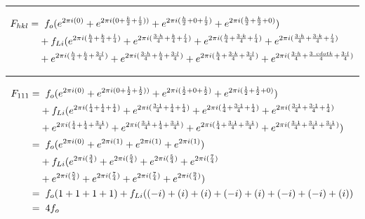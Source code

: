 \documentclass{article}
\begin{document}
	\noindent\rule{8cm}{0.4pt}
	\begin{align*}
		F_{hkl} =& \hspace{0.2cm} f_{o}  (e^{2 \pi i (0)} 
		+ e^{2 \pi i (0 + \frac{k}{2} + \frac{l}{2}))} 
		+ e^{2 \pi i (\frac{h}{2} + 0 + \frac{l}{2})} 
		+ e^{2 \pi i (\frac{h}{2} + \frac{k}{2} + 0)})  \\
		 &+ f_{Li} (e^{2 \pi i (\frac{h}{4} + \frac{k}{4} + \frac{l}{4})}  
		 + e^{2 \pi i (\frac{3 \cdot h}{4} + \frac{k}{4} + \frac{l}{4})} 
		 + e^{2 \pi i (\frac{h}{4} + \frac{3 \cdot k}{4} + \frac{l}{4})} 
		 + e^{2 \pi i (\frac{3 \cdot h}{4} + \frac{3 \cdot k}{4} + \frac{l}{4})} \\
		 &+ e^{2 \pi i (\frac{h}{4} + \frac{k}{4} + \frac{3 \cdot l}{4})}
		  + e^{2 \pi i (\frac{3 \cdot h}{4} + \frac{k}{4} + \frac{3 \cdot l}{4})} 
		  + e^{2 \pi i (\frac{h}{4} + \frac{3 \cdot k}{4} + \frac{3 \cdot l}{4})} 
		  + e^{2 \pi i (\frac{3 \cdot h}{4} + \frac{3 \ cdot k}{4} + \frac{3 \cdot l}{4})} \\
	\end{align*}


\noindent\rule{12cm}{0.4pt}
\begin{align*}
	F_{111} =& \hspace{0.2cm}  f_{o}  (e^{2 \pi i (0)} 
	+ e^{2 \pi i (0 + \frac{1}{2} + \frac{1}{2}))} 
	+ e^{2 \pi i (\frac{1}{2} + 0 + \frac{1}{2})} 
	+ e^{2 \pi i (\frac{1}{2} + \frac{1}{2} + 0)})  \\
	&+ f_{Li} (e^{2 \pi i (\frac{1}{4} + \frac{1}{4} + \frac{1}{4})}  
	+ e^{2 \pi i (\frac{3 \cdot 1}{4} + \frac{1}{4} + \frac{1}{4})} 
	+ e^{2 \pi i (\frac{1}{4} + \frac{3 \cdot 1}{4} + \frac{1}{4})} 
	+ e^{2 \pi i (\frac{3 \cdot 1}{4} + \frac{3 \cdot 1}{4} + \frac{1}{4})} \\
	&+ e^{2 \pi i (\frac{1}{4} + \frac{1}{4} + \frac{3 \cdot 1}{4})}
	+ e^{2 \pi i (\frac{3 \cdot 1}{4} + \frac{1}{4} + \frac{3 \cdot 1}{4})} 
	+ e^{2 \pi i (\frac{1}{4} + \frac{3 \cdot 1}{4} + \frac{3 \cdot 1}{4})} 
	+ e^{2 \pi i (\frac{3 \cdot 1}{4} + \frac{3 \cdot 1}{4} + \frac{3 \cdot 1}{4})}) \\  
	=& \hspace{0.2cm}  f_{o}  (e^{2 \pi i (0)} 
	+ e^{2 \pi i (1)} 
	+ e^{2 \pi i (1)} 
	+ e^{2 \pi i (1)})  \\
	&+ f_{Li} (e^{2 \pi i (\frac{3}{4})}  
	+ e^{2 \pi i (\frac{5}{4})} 
	+ e^{2 \pi i (\frac{5}{4})} 
	+ e^{2 \pi i (\frac{7}{4})} \\
	&+ e^{2 \pi i (\frac{5}{4})}
	+ e^{2 \pi i (\frac{7}{4})} 
	+ e^{2 \pi i (\frac{7}{4})} 
	+ e^{2 \pi i (\frac{9}{4})}) \\
	=& \hspace{0.2cm}  f_{o}  (1  + 1 + 1 + 1) + f_{Li}((-i) + (i) + (i) + (-i) + (i) + (-i) + (-i) + (i)) \\
	=& \hspace{0.2cm} 4f_{o} 
\end{align*}
\end{document}
